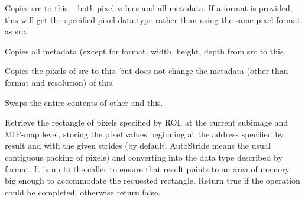 Copies {\cf src} to {\cf this} -- both pixel values and all metadata.
If a {\cf format} is provided, {\cf this} will get the specified pixel
data type rather than using the same pixel format as {\cf src}.
\apiend

Copies all metadata (except for {\cf format}, {\cf width}, {\cf height},
{\cf depth} from {\cf src} to {\cf this}.
\apiend

Copies the pixels of {\cf src} to {\cf this}, but does not change the
metadata (other than format and resolution) of {\cf this}.
\apiend

Swaps the entire contents of {\cf other} and {\cf this}.
\apiend

\NEW %
Retrieve the rectangle of pixels specified by ROI, at the current subimage
and MIP-map level, storing the pixel values beginning at the address
specified by {\cf result} and with the given strides (by default, {\cf
AutoStride} means the usual contiguous packing of pixels) and converting
into the data type described by {\cf format}.  It is up to the caller to
ensure that {\cf result} points to an area of memory big enough to
accommodate the requested rectangle. Return {\cf true} if the operation
could be completed, otherwise return {\cf false}.
\apiend


